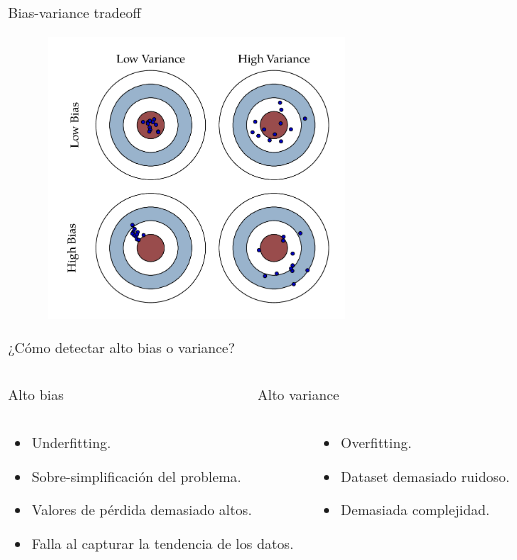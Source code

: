 
\begin{frame}{Bias-variance tradeoff}
\begin{figure}
\centering
    \includegraphics[width=0.7\textwidth]{Slides/figures/Tema 3/BiasVariance.png}
    \caption{\cite{BiasVariance}}
\end{figure}
\end{frame}

\begin{frame}{¿Cómo detectar alto bias o variance?}

\begin{columns}[c]
\begin{column}{0.49\textwidth}
\Large \alert{Alto bias}
\end{column}

\begin{column}{0.49\textwidth}
\Large \alert{Alto variance}
\end{column}
\end{columns}

\begin{columns}[c]
\begin{column}{0.49\textwidth}
\begin{itemize}
    \item Underfitting.
    \item Sobre-simplificación del problema.
    \item Valores de pérdida demasiado altos.
    \item Falla al capturar la tendencia de los datos.
\end{itemize} 
\end{column}

\begin{column}{0.49\textwidth}
\begin{itemize}
    \item Overfitting.
    \item Dataset demasiado ruidoso.
    \item Demasiada complejidad.
\end{itemize} 
\end{column}
\end{columns}
\end{frame}

